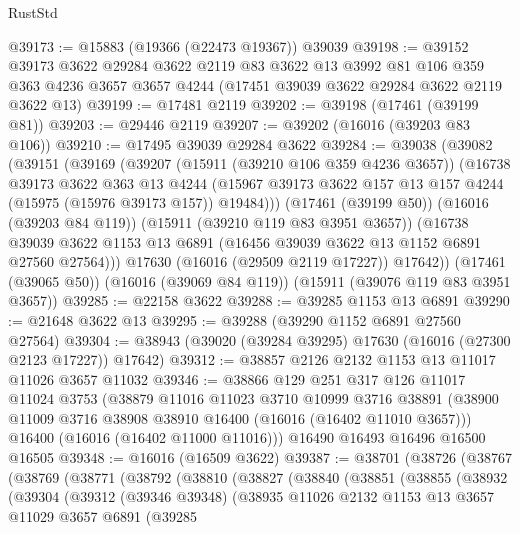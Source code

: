 \begin{lexlean}{RustStd}
\begin{coremodule}
@39173 := @15883 (@19366 (@22473 @19367)) @39039
@39198 := @39152
    @39173
    @3622
    @29284
    @3622
    @2119
    @83
    @3622
    @13
    @3992
    @81
    @106
    @359
    @363
    @4236
    @3657
    @3657
    @4244
    (@17451 @39039 @3622 @29284 @3622 @2119 @3622 @13)
@39199 := @17481 @2119
@39202 := @39198 (@17461 (@39199 @81))
@39203 := @29446 @2119
@39207 := @39202 (@16016 (@39203 @83 @106))
@39210 := @17495 @39039 @29284 @3622
@39284 := @39038
    (@39082
      (@39151
        (@39169
          (@39207
            (@15911 (@39210 @106 @359 @4236 @3657))
            (@16738
              @39173
              @3622
              @363
              @13
              @4244
              (@15967 @39173 @3622 @157 @13 @157 @4244 (@15975 (@15976 @39173 @157)) @19484)))
          (@17461 (@39199 @50))
          (@16016 (@39203 @84 @119))
          (@15911 (@39210 @119 @83 @3951 @3657))
          (@16738 @39039 @3622 @1153 @13 @6891 (@16456 @39039 @3622 @13 @1152 @6891 @27560 @27564)))
        @17630
        (@16016 (@29509 @2119 @17227))
        @17642))
    (@17461 (@39065 @50))
    (@16016 (@39069 @84 @119))
    (@15911 (@39076 @119 @83 @3951 @3657))
@39285 := @22158 @3622
@39288 := @39285 @1153 @13 @6891
@39290 := @21648 @3622 @13
@39295 := @39288 (@39290 @1152 @6891 @27560 @27564)
@39304 := @38943 (@39020 (@39284 @39295) @17630 (@16016 (@27300 @2123 @17227)) @17642)
@39312 := @38857 @2126 @2132 @1153 @13 @11017 @11026 @3657 @11032
@39346 := @38866
    @129
    @251
    @317
    @126
    @11017
    @11024
    @3753
    (@38879
      @11016
      @11023
      @3710
      @10999
      @3716
      @38891
      (@38900 @11009 @3716 @38908 @38910 @16400 (@16016 (@16402 @11010 @3657)))
      @16400
      (@16016 (@16402 @11000 @11016)))
    @16490
    @16493
    @16496
    @16500
    @16505
@39348 := @16016 (@16509 @3622)
@39387 := @38701
    (@38726
      (@38767
        (@38769
          (@38771
            (@38792
              (@38810
                (@38827
                  (@38840
                    (@38851
                      (@38855
                        (@38932
                          (@39304
                            (@39312
                              (@39346 @39348)
                              (@38935
                                @11026
                                @2132
                                @1153
                                @13
                                @3657
                                @11029
                                @3657
                                @6891
                                (@39285

\end{coremodule}
\end{lexlean}
